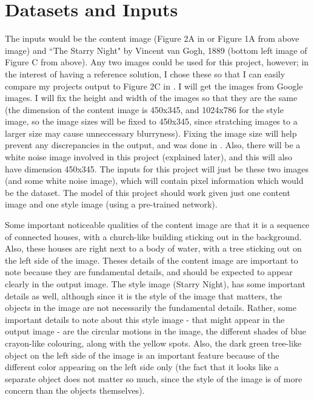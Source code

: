 \documentclass[9pt]{article}
\begin{document}
\section{Datasets and Inputs}
The inputs would be the content image (Figure 2A in \cite{Neural} or Figure 1A from above image) and ``The Starry Night" by Vincent van Gogh, 1889 (bottom left image of Figure C from above). Any two images could be used for this project, however; in the interest of having a reference solution, I chose these so that I can easily compare my projects output to Figure 2C in \cite{Image}. I will get the images from Google images. I will fix the height and width of the images so that they are the same (the dimension of the content image is 450x345, and 1024x786 for the style image, so the image sizes will be fixed to 450x345, since stratching images to a larger size may cause unneccessary blurryness). Fixing the image size will help prevent any discrepancies in the output, and was done in \cite{Neural}. Also, there will be a white noise image involved in this project (explained later), and this will also have dimension 450x345. The inputs for this project will just be these two images (and some white noise image), which will contain pixel information which would be the dataset. The model of this project should work given just one content image and one style image (using a pre-trained network).

Some important noticeable qualities of the content image are that it is a sequence of connected houses, with a church-like building sticking out in the background. Also, these houses are right next to a body of water, with a tree sticking out on the left side of the image. Theses details of the content image are important to note because they are fundamental details, and should be expected to appear clearly in the output image. The style image (Starry Night), has some important details as well, although since it is the style of the image that matters, the objects in the image are not necessarily the fundamental details. Rather, some important details to note about this style image - that might appear in the output image - are the circular motions in the image, the different shades of blue crayon-like colouring, along with the yellow spots. Also, the dark green tree-like object on the left side of the image is an important feature because of the different color appearing on the left side only (the fact that it looks like a separate object does not matter so much, since the style of the image is of more concern than the objects themselves). 
\end{document}
